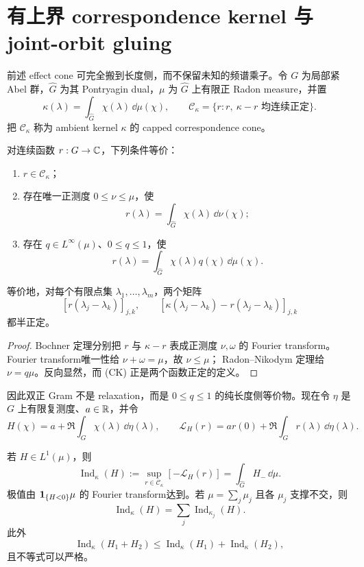 \section{有上界 correspondence kernel 与 joint-orbit gluing}

前述 effect cone 可完全搬到长度侧，而不保留未知的频谱乘子。令 $G$ 为局部紧
Abel 群，$\widehat G$ 为其 Pontryagin dual，$\mu$ 为 $\widehat G$ 上有限正
Radon measure，并置
\[
 \kappa(\lambda)=\int_{\widehat G}\chi(\lambda)\,\dd\mu(\chi),\qquad
 \mathcal C_\kappa=\{r:r,\ \kappa-r\text{ 均连续正定}\}.
\]
把 $\mathcal C_\kappa$ 称为 ambient kernel $\kappa$ 的 capped
correspondence cone。

\begin{theorem}
\label{thm:capped-correspondence}
对连续函数 $r:G\to\mathbb C$，下列条件等价：
\begin{enumerate}
 \item $r\in\mathcal C_\kappa$；
 \item 存在唯一正测度 $0\leq\nu\leq\mu$，使
 \[
   r(\lambda)=\int_{\widehat G}\chi(\lambda)\,\dd\nu(\chi);
 \]
 \item 存在 $q\in L^\infty(\mu)$、$0\leq q\leq1$，使
 \[
   r(\lambda)=\int_{\widehat G}\chi(\lambda)q(\chi)\,\dd\mu(\chi).
 \]
\end{enumerate}
等价地，对每个有限点集 $\lambda_1,\ldots,\lambda_m$，两个矩阵
\[
 [r(\lambda_j-\lambda_k)]_{j,k},\qquad
 [\kappa(\lambda_j-\lambda_k)-r(\lambda_j-\lambda_k)]_{j,k}
 \tag{CK}
\]
都半正定。
\end{theorem}

\begin{proof}
Bochner 定理分别把 $r$ 与 $\kappa-r$ 表成正测度 $\nu,\omega$ 的 Fourier
transform。Fourier transform唯一性给 $\nu+\omega=\mu$，故 $\nu\leq\mu$；
Radon--Nikodym 定理给 $\nu=q\mu$。反向显然，而 (CK) 正是两个函数正定的定义。
\end{proof}

因此双正 Gram 不是 relaxation，而是 $0\leq q\leq1$ 的纯长度侧等价物。现在令
$\eta$ 是 $G$ 上有限复测度、$a\in\mathbb R$，并令
\[
 H(\chi)=a+\Re\int_G\chi(\lambda)\,\dd\eta(\lambda),\qquad
 \mathcal L_H(r)=ar(0)+\Re\int_G r(\lambda)\,\dd\eta(\lambda).
\]

\begin{theorem}
\label{thm:correspondence-index}
若 $H\in L^1(\mu)$，则
\[
 \operatorname{Ind}_\kappa(H)
 :=\sup_{r\in\mathcal C_\kappa}[-\mathcal L_H(r)]
 =\int_{\widehat G}H_-\,\dd\mu.                 \tag{CI}
\]
极值由 $\mathbf 1_{\{H<0\}}\mu$ 的 Fourier transform达到。若
$\mu=\sum_j\mu_j$ 且各 $\mu_j$ 支撑不交，则
\[
 \operatorname{Ind}_\kappa(H)=
 \sum_j\operatorname{Ind}_{\kappa_j}(H).        \tag{BG}
\]
此外
\[
 \operatorname{Ind}_\kappa(H_1+H_2)
 \leq\operatorname{Ind}_\kappa(H_1)+
      \operatorname{Ind}_\kappa(H_2),           \tag{JC}
\]
且不等式可以严格。
\end{theorem}

